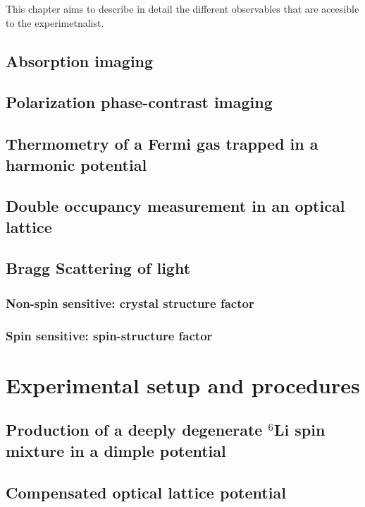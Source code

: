 \documentclass[oneside,11pt]{memoir}
\begin{document}
This chapter aims to describe in detail the different observables that are
accesible to the experimetnalist.  

\section{Absorption imaging} 

\section{Polarization phase-contrast imaging} 

\section{Thermometry of a Fermi gas trapped in a harmonic potential} 

\section{Double occupancy measurement in an optical lattice }

\section{Bragg Scattering of light}
 
\subsection{ Non-spin sensitive: crystal structure factor}
\subsection{ Spin sensitive:  spin-structure factor} 

\chapter{Experimental setup and procedures} 

\section{Production of a deeply degenerate $^{6}$Li spin mixture in a dimple potential } 

\section{Compensated optical lattice potential} 
\end{document}
